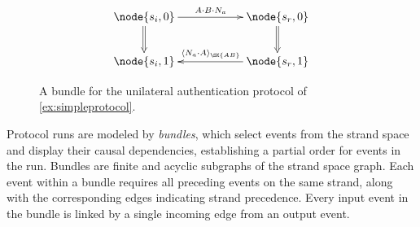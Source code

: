 \begin{figure}[t]
  $$\xymatrix@R=3mm@C=20mm{
  \node{s_i,0}\ar@{=>}[dd]\ar[r]^{A \cdot B \cdot N_a}&\node{s_r,0}\ar@{=>}[dd]\\ \\
  \node{s_i,1}&\node{s_r,1}\ar[l]_{\enc{N_a \cdot A}{ \SK{AB}}}\\
  }$$
  \caption{A bundle for the unilateral authentication protocol of \cref{ex:simpleprotocol}.}
  \label{fig:simpleprotocol}
\end{figure}

 Protocol runs are modeled by \emph{bundles}, which select events from the strand space and display their causal dependencies, establishing a partial order for events in the run.
 Bundles are finite and acyclic subgraphs of the strand space graph. Each event within a bundle requires all preceding events on the same strand, along with the corresponding edges indicating strand precedence. Every input event in the bundle is linked by a single incoming edge from an output event.




